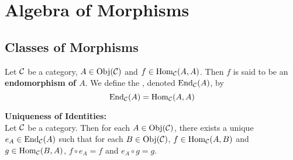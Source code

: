 \documentclass{book}
\begin{document}
	
	
	
	
	
	
	
	
	
	
	
	
	
	
	
	
	
	
	
	
	
	
	
	
	
	
	
	
	
	
	
	
	
	
	
	
	
	
	
	
	
	
	
	
	
	
	
	
	
	
	\newpage
	\section{Algebra of Morphisms}

	
	\subsection{Classes of Morphisms}
	
	\begin{defn} 
		Let $\mathcal{C}$ be a category, $A \in \operatorname{Obj}(\mathcal{C})$ and $f \in \operatorname{Hom}_{\mathcal{C}}(A, A)$. Then $f$ is said to be an \textbf{endomorphism of $A$}. We define the , denoted $\operatorname{End}_{\mathcal{C}}(A)$, by 
		$$\operatorname{End}_{\mathcal{C}}(A) = \operatorname{Hom}_{\mathcal{C}}(A, A)$$ 
	\end{defn}
	
	\begin{ex}  \textbf{Uniqueness of Identities:} \\
		Let $\mathcal{C}$ be a category. Then for each $A \in \operatorname{Obj}(\mathcal{C})$, there exists a unique $e_A \in \operatorname{End}_{\mathcal{C}}(A)$ such that for each $B \in \operatorname{Obj}(\mathcal{C})$, $f \in \operatorname{Hom}_{\mathcal{C}}(A, B)$ and $g \in \operatorname{Hom}_{\mathcal{C}}(B, A)$, $f \circ e_A = f$ and $e_{A} \circ g = g$.
	\end{ex}
	
\end{document}
